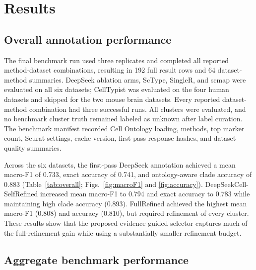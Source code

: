 \documentclass[referee,lineno,pdflatex]{sn-jnl}
\begin{document}
\section{Results}\label{sec:results}

\subsection{Overall annotation performance}

The final benchmark run used three replicates and completed all reported method-dataset combinations, resulting in 192 full result rows and 64 dataset-method summaries. DeepSeek ablation arms, ScType, SingleR, and scmap were evaluated on all six datasets; CellTypist was evaluated on the four human datasets and skipped for the two mouse brain datasets. Every reported dataset-method combination had three successful runs. All clusters were evaluated, and no benchmark cluster truth remained labeled as unknown after label curation. The benchmark manifest recorded Cell Ontology loading, methods, top marker count, Seurat settings, cache version, first-pass response hashes, and dataset quality summaries.

Across the six datasets, the first-pass DeepSeek annotation achieved a mean macro-F1 of 0.733, exact accuracy of 0.741, and ontology-aware clade accuracy of 0.883 (Table~\ref{tab:overall}; Figs.~\ref{fig:macroF1} and \ref{fig:accuracy}). DeepSeekCell-SelfRefined increased mean macro-F1 to 0.794 and exact accuracy to 0.783 while maintaining high clade accuracy (0.893). FullRefined achieved the highest mean macro-F1 (0.808) and accuracy (0.810), but required refinement of every cluster. These results show that the proposed evidence-guided selector captures much of the full-refinement gain while using a substantially smaller refinement budget.

\subsection{Aggregate benchmark performance}
\end{document}
